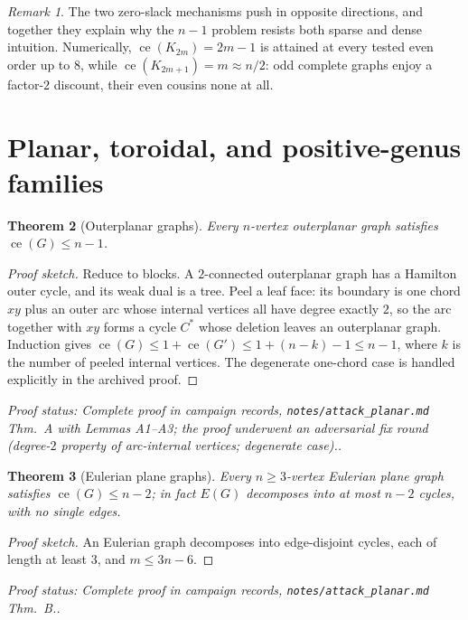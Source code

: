 \documentclass[a4paper,11pt]{amsart}
\newtheorem{theorem}{Theorem}[section]
\theoremstyle{definition}
\theoremstyle{remark}
\newtheorem{remark}[theorem]{Remark}
\newcommand{\ce}{\operatorname{ce}}
\newcommand{\proofsrc}[1]{\par\smallskip\noindent\begin{sloppypar}\small\emph{Proof status: #1.}\end{sloppypar}\par\smallskip}
\begin{document}
\begin{remark}\label{rem:zeroslack}
The two zero-slack mechanisms push in opposite directions, and together they explain why the $n-1$ problem
resists both sparse and dense intuition. Numerically, $\ce(K_{2m})=2m-1$ is attained at every tested even
order up to $8$, while $\ce(K_{2m+1})=m\approx n/2$: odd complete graphs enjoy a factor-$2$ discount, their
even cousins none at all.
\end{remark}

\section{Planar, toroidal, and positive-genus families}\label{sec:planar}

\begin{theorem}[Outerplanar graphs]\label{thm:outerplanar}
Every $n$-vertex outerplanar graph satisfies $\ce(G)\le n-1$.
\end{theorem}
\begin{proof}[Proof sketch]
Reduce to blocks. A $2$-connected outerplanar graph has a Hamilton outer cycle, and its weak dual is a
tree. Peel a leaf face: its boundary is one chord $xy$ plus an outer arc whose internal vertices all have
degree exactly $2$, so the arc together with $xy$ forms a cycle $C^*$ whose deletion leaves an outerplanar
graph. Induction gives $\ce(G)\le1+\ce(G')\le1+(n-k)-1\le n-1$, where $k$ is the number of peeled internal
vertices. The degenerate one-chord case is handled explicitly in the archived proof.
\end{proof}
\proofsrc{Complete proof in campaign records, \texttt{notes/attack\_planar.md} Thm.~A with Lemmas A1--A3;
the proof underwent an adversarial fix round (degree-$2$ property of arc-internal vertices; degenerate
case).}

\begin{theorem}[Eulerian plane graphs]\label{thm:eulerplanar}
Every $n\ge3$-vertex Eulerian plane graph satisfies $\ce(G)\le n-2$; in fact $E(G)$ decomposes into at most
$n-2$ cycles, with no single edges.
\end{theorem}
\begin{proof}[Proof sketch]
An Eulerian graph decomposes into edge-disjoint cycles, each of length at least $3$, and $m\le 3n-6$.
\end{proof}
\proofsrc{Complete proof in campaign records, \texttt{notes/attack\_planar.md} Thm.~B.}
\end{document}
